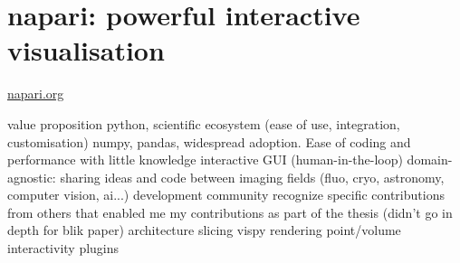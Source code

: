 \chapter{napari: powerful interactive visualisation}

\href{https://napari.org/}{napari.org}

\begin{outline}
\1 value proposition
    \2 python, scientific ecosystem (ease of use, integration, customisation)
    \2 numpy, pandas, widespread adoption. Ease of coding and performance with little knowledge
    \2 interactive GUI (human-in-the-loop)
    \2 domain-agnostic: sharing ideas and code between imaging fields (fluo, cryo, astronomy, computer vision, ai...)
\1 development
    \2 community
        \3 recognize specific contributions from others that enabled me
    \2 my contributions as part of the thesis (didn't go in depth for blik paper)
        \3 architecture
        \3 slicing
        \3 vispy rendering
        \3 point/volume interactivity
        \3 plugins
\end{outline}
